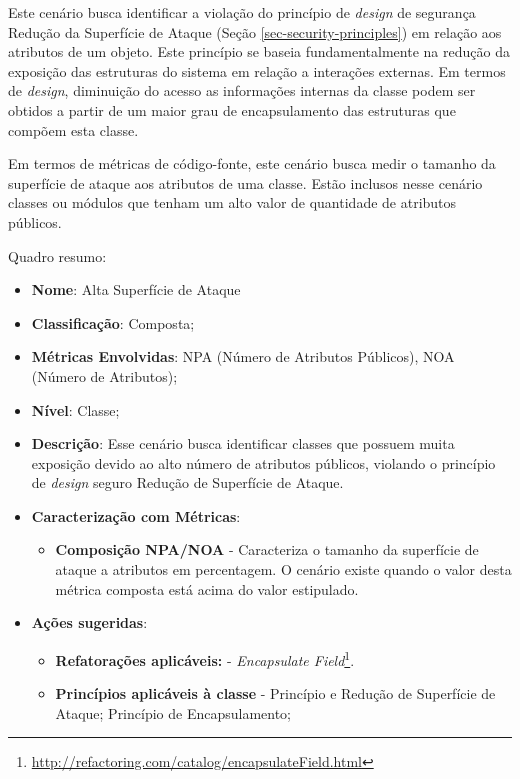 %

Este cenário busca identificar a violação do princípio de \emph{design} de segurança Redução da Superfície de Ataque (Seção \ref{sec-security-principles}) em relação aos atributos de um objeto. Este princípio se baseia fundamentalmente na redução da exposição das estruturas do sistema em relação a interações externas. Em termos de \emph{design}, diminuição do acesso as informações internas da classe podem ser obtidos a partir de um maior grau de encapsulamento das estruturas que compõem esta classe. 

%

Em termos de métricas de código-fonte, este cenário busca medir o tamanho da superfície de ataque aos atributos de uma classe. Estão inclusos nesse cenário classes ou módulos que tenham um alto valor de quantidade de atributos públicos. 

%

Quadro resumo:

\begin{itemize}
\item \textbf{Nome}: Alta Superfície de Ataque
\item \textbf{Classificação}: Composta;
\item \textbf{Métricas Envolvidas}: NPA (Número de Atributos Públicos), NOA (Número de Atributos);
\item \textbf{Nível}: Classe;
\item \textbf{Descrição}: Esse cenário busca identificar classes que possuem muita exposição devido ao alto número de atributos públicos, violando o princípio de \emph{design} seguro Redução de Superfície de Ataque.
\item \textbf{Caracterização com Métricas}: 
	\begin{itemize}
	\item \textbf{Composição NPA/NOA} - Caracteriza o tamanho da superfície de ataque a atributos em percentagem. O cenário existe quando o valor desta métrica composta está acima do valor estipulado.
	\end{itemize}
\item \textbf{Ações sugeridas}:
	\begin{itemize}
	\item \textbf{Refatorações aplicáveis:} - \emph{Encapsulate Field}\footnote{\url{http://refactoring.com/catalog/encapsulateField.html}}.
	\item \textbf{Princípios aplicáveis à classe} - Princípio e Redução de Superfície de Ataque; Princípio de Encapsulamento;
	\end{itemize}
\end{itemize}

